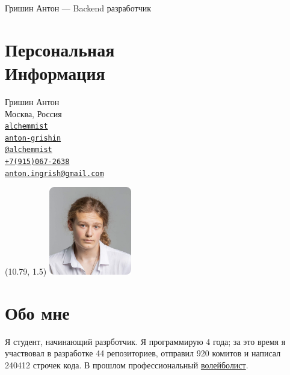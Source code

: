 \documentclass[margin,line]{resume}
\begin{document}
{\sc \large Гришин Антон --- Backend разработчик} \\
\begin{resume}
  \begin{minipage}[t]{0.55\textwidth}
    \section{\mysidestyle Персональная\\Информация}
    Гришин Антон \\
    Москва, Россия \\
    \faGithub  \space
    \href{https://github.com/alchemmist/}{\texttt{alchemmist}} \\
    \faLinkedin \space
    \href{https://www.linkedin.com/in/anton-grishin-6966a8362/}{\texttt{anton-grishin}}
    \\
    \faPaperPlane \space \href{https://t.me/alchemmist}{\texttt{@alchemmist}} \\
    \faPhone \space
    \href{tel:+1234567890}{\color{blue}\texttt{+7(915)067-2638}}  \\
    \faEnvelope \space
    \href{mailto:anton.ingrish@gmail.com}{\color{blue}\texttt{anton.ingrish@gmail.com}}
  \end{minipage}

  \begin{minipage}[H]{0.18\textwidth}
    \begin{textblock}{7}(10.79, 1.5)
      \includegraphics[width=0.27\textwidth]{images/avatar.png}
    \end{textblock}
  \end{minipage}


  \section{\mysidestyle Обо мне}
  Я студент, начинающий разрботчик. Я программирую 4 года; за
  это время я участвовал в разработке 44 репозиториев, отправил 920
  комитов и написал
  240412 строчек кода. В прошлом профессиональный
  \href{https://github.com/alchemmist/CV/blob/main/attachments/sport.pdf}{волейболист}.


\end{resume}
\end{document}
